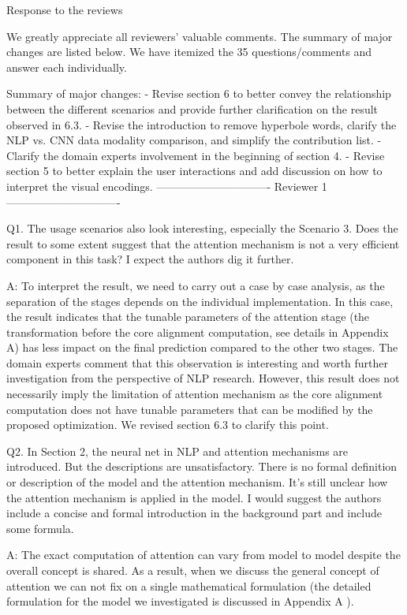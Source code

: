 Response to the reviews

We greatly appreciate all reviewers' valuable comments. The summary of major changes are listed below. We have itemized the 35 questions/comments and answer each individually.

Summary of major changes:
- Revise section 6 to better convey the relationship between the different scenarios and provide further clarification on the result observed in 6.3.
- Revise the introduction to remove hyperbole words, clarify the NLP vs. CNN data modality comparison, and simplify the contribution list.
- Clarify the domain experts involvement in the beginning of section 4.
- Revise section 5 to better explain the user interactions and add discussion on how to interpret the visual encodings.
------------------------------- Reviewer 1 -------------------------------


Q1. The usage scenarios also look interesting, especially the Scenario 3. Does the result to some extent suggest that the attention mechanism is not a very efficient component in this task? I expect the authors dig it further.

A: To interpret the result, we need to carry out a case by case analysis, as the separation of the stages depends on the individual implementation. In this case, the result indicates that the tunable parameters of the attention stage (the transformation before the core alignment computation, see details in Appendix A) has less impact on the final prediction compared to the other two stages. The domain experts comment that this observation is interesting and worth further investigation from the perspective of NLP research. However, this result does not necessarily imply the limitation of attention mechanism as the core alignment computation does not have tunable parameters that can be modified by the proposed optimization. We revised section 6.3 to clarify this point.


Q2. In Section 2, the neural net in NLP and attention mechanisms are introduced. But the descriptions are unsatisfactory. There is no formal definition or description of the model and the attention mechanism. It's still unclear how the attention mechanism is applied in the model. I would suggest the authors include a concise and formal introduction in the background part and include some formula.

A: The exact computation of attention can vary from model to model despite the overall concept is shared. As a result, when we discuss the general concept of attention we can not fix on a single mathematical formulation (the detailed formulation for the model we investigated is discussed in Appendix A ). 

